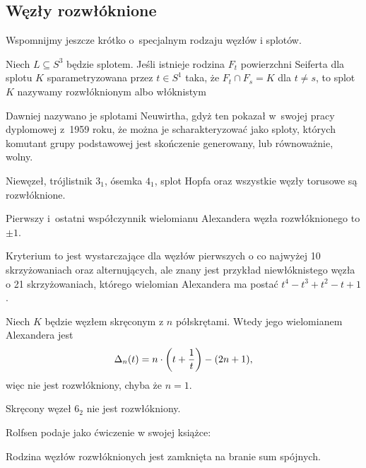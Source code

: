 
\subsection{Węzły rozwłóknione}
Wspomnijmy jeszcze krótko o~specjalnym rodzaju węzłów i splotów.

\begin{definition}
    Niech $L \subseteq S^3$ będzie splotem.
    Jeśli istnieje rodzina $F_t$ powierzchni Seiferta dla splotu $K$ sparametryzowana przez $t \in S^1$ taka, że $F_t \cap F_s = K$ dla $t \neq s$, to splot $K$ nazywamy rozwłóknionym albo włóknistym
\end{definition}

Dawniej nazywano je splotami Neuwirtha, gdyż ten pokazał w~swojej pracy dyplomowej z~1959 roku, że można je scharakteryzować jako sploty, których komutant grupy podstawowej jest skończenie generowany, lub równoważnie, wolny.

\begin{example}
    Niewęzeł, trójlistnik $3_1$, ósemka $4_1$, splot Hopfa oraz wszystkie węzły torusowe są rozwłóknione.
\end{example}

\begin{proposition}
    Pierwszy i~ostatni współczynnik wielomianu Alexandera węzła rozwłóknionego to $\pm 1$.
\end{proposition}

Kryterium to jest wystarczające dla węzłów pierwszych o co najwyżej 10 skrzyżowaniach oraz alternujących, ale znany jest przykład niewłóknistego węzła o 21 skrzyżowaniach, którego wielomian Alexandera ma postać $t^4 - t^3 + t^2 - t +1$.

\begin{proposition}
%
    Niech $K$ będzie węzłem skręconym z $n$ półskrętami.
    Wtedy jego wielomianem Alexandera jest
    \begin{equation}
        \Delta_n(t) = n \cdot \left(t + \frac 1 t\right)  - (2n+1),
    \end{equation}
    więc nie jest rozwłókniony, chyba że $n = 1$.
\end{proposition}

\begin{corollary}
    Skręcony węzeł $6_2$ nie jest rozwłókniony.
\end{corollary}

Rolfsen \cite[s. 326]{rolfsen76} podaje jako ćwiczenie w swojej książce:

\begin{proposition}
    Rodzina węzłów rozwłóknionych jest zamknięta na branie sum spójnych.
\end{proposition}




